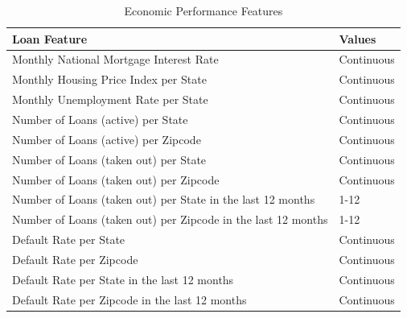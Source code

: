              \begin{table}[H]
                \centering
                \caption{Economic Performance Features} \vspace{0.5cm}
                \label{4: table_economic_performance_features}
                \begin{tabular}{|p{11.5cm}|p{2.5cm}|}
                    \hline \textbf{Loan Feature} & \textbf{Values} \\ \hline \hline
    
                    Monthly National Mortgage Interest Rate  & Continuous \\ \hline
                    
                    Monthly Housing Price Index per State & Continuous \\ \hline
                    Monthly Unemployment Rate per State  & Continuous \\ \hline
                    
                    Number of Loans (active) per State & Continuous \\ \hline
                    Number of Loans (active) per Zipcode & Continuous \\ \hline
                    
                    Number of Loans (taken out) per State & Continuous \\ \hline
                    Number of Loans (taken out) per Zipcode  & Continuous \\ \hline
                    
                    Number of Loans (taken out) per State in the last 12 months & 1-12 \\ \hline
                    Number of Loans (taken out) per Zipcode in the last 12 months & 1-12  \\ \hline
                
                    Default Rate per State & Continuous \\ \hline
                    Default Rate per Zipcode & Continuous \\ \hline
                    
                    Default Rate per State in the last 12 months & Continuous \\ \hline
                    Default Rate per Zipcode in the last 12 months  & Continuous \\ \hline
                    

\end{tabular}
\end{table}
